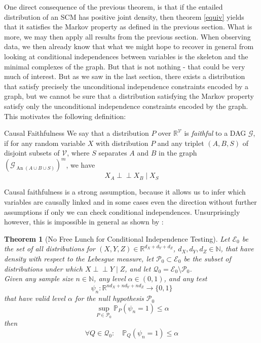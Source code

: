 \documentclass[11pt, a4paper]{memoir}
\theoremstyle{break}
\newtheorem{thm}{Theorem}
\theoremstyle{break}
\theoremstyle{nonumberplain}
\newcommand{\mN}{\mathbb{N}}
\newcommand{\mR}{\mathbb{R}}
\newcommand{\mP}{\mathbb{P}}
\newcommand{\indep}{\perp \!\!\! \perp}
\DeclareMathOperator{\an}{An}
\begin{document}
One direct consequence of the previous theorem, is that if the entailed distribution of an SCM has positive joint density, then theorem \ref{equiv} yields that it satisfies the Markov property as defined in the previous section. What is more, we may then apply all results from the previous section. When observing data, we then already know that what we might hope to recover in general from looking at conditional independences between variables is the skeleton and the minimal complexes of the graph. But that is not nothing - that could be very much of interest. But as we saw in the last section, there exists a distribution that satisfy precisely the unconditional independence constraints encoded by a graph, but we cannot be sure that a distribution satisfying the Markov property satisfy only the unconditional independence constraints encoded by the graph. This motivates the following definition:
\begin{mydefinition}{Causal Faithfulness}
We say that a distribution $P$ over $\mR^{\mathcal{V}}$ is \emph{faithful} to a DAG $\mathcal{G}$, if for any random variable $X$ with distribution $P$ and any triplet $(A,B,S)$ of disjoint subsets of $\mathcal{V}$, where $S$ separates $A$ and $B$ in the graph $\left(\mathcal{G}_{\an(A\cup B\cup S)}\right)^m$, we have
$$X_A\indep X_B\mid X_S$$
\end{mydefinition}
Causal faithfulness is a strong assumption, because it allows us to infer which variables are causally linked and in some cases even the direction without further assumptions if only we can check conditional independences. Unsurprisingly however, this is impossible in general as shown by \cite{CondIndTest}:
\begin{thm}[No Free Lunch for Conditional Independence Testing]
Let $\mathcal{E}_0$ be the set of all distributions for $(X,Y,Z)\in \mR^{d_X+d_Y+d_Z}$, $d_X,d_Y,d_Z\in \mN$, that have density with respect to the Lebesgue measure, let $\mathcal{P}_0\subset \mathcal{E_0}$ be the subset of distributions under which $X\indep Y\mid Z$, and let $\mathcal{Q}_0=\mathcal{E}_0\setminus\mathcal{P}_0$.\\[5pt]
Given any sample size $n\in \mN$, any level $\alpha\in (0,1)$, and any test
$$\psi_n:\mR^{nd_X+nd_Y+nd_Z}\to \{0,1\}$$
that have valid level $\alpha$ for the null hypothesis $\mathcal{P}_0$
$$\sup_{P\in \mathcal{P}_0}\mP_P(\psi_n=1)\leq \alpha$$
then
$$\forall Q\in \mathcal{Q}_0:\quad \mP_Q(\psi_n=1)\leq \alpha$$
\end{thm}
\end{document}
